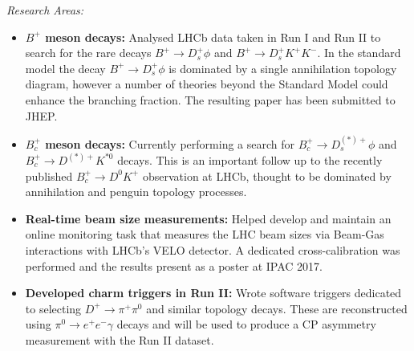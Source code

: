 \documentclass[11pt,a4paper]{article}
\begin{document}
\noindent\emph{Research Areas:} 
\begin{itemize}
\setlength\itemsep{0em}
\item {\bf $B^{+}$ meson decays:} Analysed LHCb data taken in Run I and Run II  to search for the rare decays $B^{+} \to D_{s}^{+} \phi$ and $B^{+} \to D_{s}^{+} K^{+} K^{-}$. In the standard model the decay $B^{+} \to D_{s}^{+} \phi$ is dominated by a single annihilation topology diagram, however a number of theories beyond the Standard Model could enhance the branching fraction. The resulting paper has been submitted to JHEP.

\item {\bf $B_{c}^{+}$ meson decays:} Currently performing a search for $B_{c}^{+} \to D_{s}^{(*)+}\phi$  and $B_{c}^{+} \to D^{(*)+}K^{*0}$ decays. This is an important follow up to the recently published $B_{c}^{+} \to D^{0} K^{+}$ observation at LHCb, thought to be dominated by annihilation and penguin topology processes.

\item {\bf Real-time beam size measurements:} Helped develop and maintain an online monitoring task that measures the LHC beam sizes via Beam-Gas interactions with LHCb's VELO detector. A dedicated cross-calibration was performed and the results present as a poster at IPAC 2017.

\item {\bf Developed charm triggers in Run II:} Wrote software triggers dedicated to selecting $D^{+} \to \pi^{+} \pi^{0}$ and similar topology decays. These are reconstructed using $\pi^{0} \to e^{+} e^{-} \gamma$ decays and will be used to produce a CP asymmetry measurement with the Run II dataset.
\end{itemize}
\end{document}
